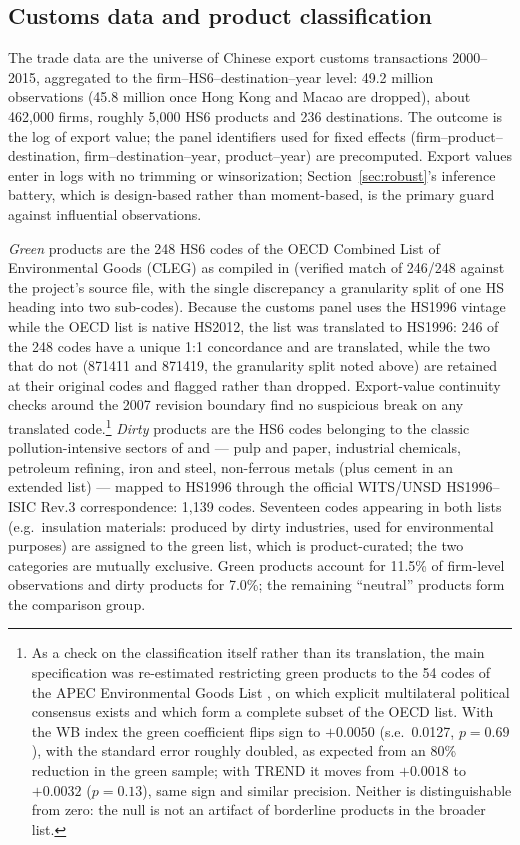 \documentclass[12pt]{article}
\begin{document}
\subsection{Customs data and product classification}

The trade data are the universe of Chinese export customs transactions 2000--2015,
aggregated to the firm--HS6--destination--year level: 49.2 million observations
(45.8 million once Hong Kong and Macao are dropped), about 462{,}000 firms, roughly
5{,}000 HS6 products and 236 destinations. The outcome is the log of export value; the
panel identifiers used for fixed effects (firm--product--destination,
firm--destination--year, product--year) are precomputed.
Export values enter in logs with no trimming or winsorization;
Section~\ref{sec:robust}'s inference battery, which is design-based rather than
moment-based, is the primary guard against influential observations.

\emph{Green} products are the 248 HS6 codes of the OECD Combined List of Environmental
Goods (CLEG) as compiled in \citet{sauvage2014} (verified match of 246/248
against the project's source file, with the single discrepancy a granularity split of
one HS heading into two sub-codes). Because the customs panel uses the HS1996 vintage
while the OECD list is native HS2012, the list was translated to HS1996: 246 of the 248
codes have a unique 1:1 concordance and are translated, while the two that do not
(871411 and 871419, the granularity split noted above) are retained at their original
codes and flagged rather than dropped. Export-value continuity checks around the 2007
revision boundary find no suspicious break on any translated code.\footnote{As a check
on the classification itself rather than its translation, the main specification was
re-estimated restricting green products to the 54 codes of the APEC Environmental Goods
List \citep{sauvage2014}, on which explicit multilateral political consensus exists and
which form a complete subset of the OECD list. With the WB index the green coefficient flips sign to $+0.0050$ (s.e.\ 0.0127, $p=0.69$), with the standard error roughly doubled, as expected from an 80\% reduction in the green sample; with TREND it moves from $+0.0018$ to $+0.0032$ ($p=0.13$), same sign and similar precision. Neither is distinguishable from zero: the null is not an artifact of borderline products in the broader list.} \emph{Dirty} products are the HS6 codes belonging to the classic
pollution-intensive sectors of \citet{mani1998} and \citet{low1992} --- pulp and paper,
industrial chemicals, petroleum refining, iron and steel, non-ferrous metals (plus
cement in an extended list) --- mapped to HS1996 through the official WITS/UNSD
HS1996--ISIC Rev.3 correspondence: 1{,}139 codes. Seventeen codes appearing in both
lists (e.g.\ insulation materials: produced by dirty industries, used for environmental
purposes) are assigned to the green list, which is product-curated; the two categories
are mutually exclusive. Green products account for 11.5\% of firm-level observations and
dirty products for 7.0\%; the remaining ``neutral'' products form the comparison group.
\end{document}
